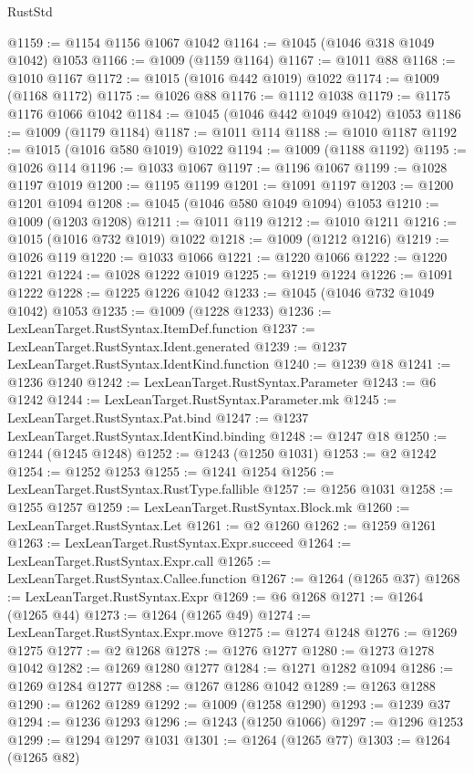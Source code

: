 \begin{lexlean}{RustStd}
\begin{coremodule}
@1159 := @1154 @1156 @1067 @1042
@1164 := @1045 (@1046 @318 @1049 @1042) @1053
@1166 := @1009 (@1159 @1164)
@1167 := @1011 @88
@1168 := @1010 @1167
@1172 := @1015 (@1016 @442 @1019) @1022
@1174 := @1009 (@1168 @1172)
@1175 := @1026 @88
@1176 := @1112 @1038
@1179 := @1175 @1176 @1066 @1042
@1184 := @1045 (@1046 @442 @1049 @1042) @1053
@1186 := @1009 (@1179 @1184)
@1187 := @1011 @114
@1188 := @1010 @1187
@1192 := @1015 (@1016 @580 @1019) @1022
@1194 := @1009 (@1188 @1192)
@1195 := @1026 @114
@1196 := @1033 @1067
@1197 := @1196 @1067
@1199 := @1028 @1197 @1019
@1200 := @1195 @1199
@1201 := @1091 @1197
@1203 := @1200 @1201 @1094
@1208 := @1045 (@1046 @580 @1049 @1094) @1053
@1210 := @1009 (@1203 @1208)
@1211 := @1011 @119
@1212 := @1010 @1211
@1216 := @1015 (@1016 @732 @1019) @1022
@1218 := @1009 (@1212 @1216)
@1219 := @1026 @119
@1220 := @1033 @1066
@1221 := @1220 @1066
@1222 := @1220 @1221
@1224 := @1028 @1222 @1019
@1225 := @1219 @1224
@1226 := @1091 @1222
@1228 := @1225 @1226 @1042
@1233 := @1045 (@1046 @732 @1049 @1042) @1053
@1235 := @1009 (@1228 @1233)
@1236 := LexLeanTarget.RustSyntax.ItemDef.function
@1237 := LexLeanTarget.RustSyntax.Ident.generated
@1239 := @1237 LexLeanTarget.RustSyntax.IdentKind.function
@1240 := @1239 @18
@1241 := @1236 @1240
@1242 := LexLeanTarget.RustSyntax.Parameter
@1243 := @6 @1242
@1244 := LexLeanTarget.RustSyntax.Parameter.mk
@1245 := LexLeanTarget.RustSyntax.Pat.bind
@1247 := @1237 LexLeanTarget.RustSyntax.IdentKind.binding
@1248 := @1247 @18
@1250 := @1244 (@1245 @1248)
@1252 := @1243 (@1250 @1031)
@1253 := @2 @1242
@1254 := @1252 @1253
@1255 := @1241 @1254
@1256 := LexLeanTarget.RustSyntax.RustType.fallible
@1257 := @1256 @1031
@1258 := @1255 @1257
@1259 := LexLeanTarget.RustSyntax.Block.mk
@1260 := LexLeanTarget.RustSyntax.Let
@1261 := @2 @1260
@1262 := @1259 @1261
@1263 := LexLeanTarget.RustSyntax.Expr.succeed
@1264 := LexLeanTarget.RustSyntax.Expr.call
@1265 := LexLeanTarget.RustSyntax.Callee.function
@1267 := @1264 (@1265 @37)
@1268 := LexLeanTarget.RustSyntax.Expr
@1269 := @6 @1268
@1271 := @1264 (@1265 @44)
@1273 := @1264 (@1265 @49)
@1274 := LexLeanTarget.RustSyntax.Expr.move
@1275 := @1274 @1248
@1276 := @1269 @1275
@1277 := @2 @1268
@1278 := @1276 @1277
@1280 := @1273 @1278 @1042
@1282 := @1269 @1280 @1277
@1284 := @1271 @1282 @1094
@1286 := @1269 @1284 @1277
@1288 := @1267 @1286 @1042
@1289 := @1263 @1288
@1290 := @1262 @1289
@1292 := @1009 (@1258 @1290)
@1293 := @1239 @37
@1294 := @1236 @1293
@1296 := @1243 (@1250 @1066)
@1297 := @1296 @1253
@1299 := @1294 @1297 @1031
@1301 := @1264 (@1265 @77)
@1303 := @1264 (@1265 @82)

\end{coremodule}
\end{lexlean}
